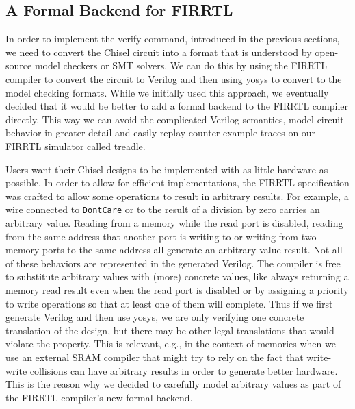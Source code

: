 \documentclass[conference]{IEEEtran}
\newcommand{\code}[1]{{\small{\texttt{#1}}}}
\begin{document}
\subsection{A Formal Backend for FIRRTL}\label{sec:undef}


In order to implement the verify command, introduced in the previous sections, we need to convert the Chisel circuit into a format that is understood
by open-source model checkers or SMT solvers.
We can do this by using the FIRRTL compiler to convert the circuit to Verilog and then using yosys to convert to the
model checking formats.
While we initially used this approach, we eventually decided that it would be better to add a formal backend to the FIRRTL
compiler directly.
This way we can avoid the complicated Verilog semantics, model circuit behavior in greater detail and easily replay counter
example traces on our FIRRTL simulator called treadle.

Users want their Chisel designs to be implemented with as little hardware as possible.
In order to allow for efficient implementations, the FIRRTL specification was crafted to allow
some operations to result in arbitrary results.
For example, a wire connected to \code{DontCare} or to the result of a division by zero carries an arbitrary value.
Reading from a memory while the read port is disabled, reading from the same address that another port is writing to or
writing from two memory ports to the same address all generate an arbitrary value result.
Not all of these behaviors are represented in the generated Verilog.
The compiler is free to substitute arbitrary values with (more) concrete values, like always returning a memory read result even
when the read port is disabled or by assigning a priority to write operations so that at least one of them will complete.
Thus if we first generate Verilog and then use yosys, we are only verifying one concrete translation of the design,
but there may be other legal translations that would violate the property.
This is relevant, e.g., in the context of memories when we use an external SRAM compiler that might try to
rely on the fact that write-write collisions can have arbitrary results in order to generate better hardware.
This is the reason why we decided to carefully model arbitrary values as part of the FIRRTL compiler's new formal backend.
\end{document}
